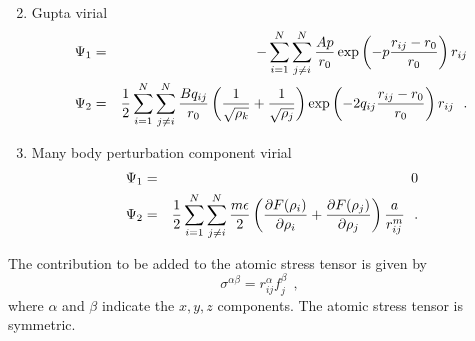 \begin{enumerate}
\begin{eqnarray}
\end{eqnarray}
\item Gupta virial
\begin{eqnarray}
\Psi_{1} &=& -\sum_{i=1}^{N} \sum_{j \ne i}^{N}
\frac{A p}{r_{0}} \exp \left( -p \frac{r_{ij}-r_{0}}{r_{0}} \right) r_{ij} \nonumber \\
\Psi_{2} &=& {1 \over 2} \sum_{i=1}^{N} \sum_{j \ne i}^{N} \frac{B q_{ij}}{r_{0}}
\left( {1 \over \sqrt{\rho_{k}}} + {1 \over \sqrt{\rho_{j}}} \right)
\exp \left( -2 q_{ij} \frac{r_{ij}-r_{0}}{r_{0}} \right) r_{ij}~~.
\end{eqnarray}
\item Many body perturbation component virial
\begin{eqnarray}
\Psi_{1} &=& 0 \nonumber \\
\Psi_{2} &=& {1 \over 2} \sum_{i=1}^{N} \sum_{j \ne i}^{N} \frac{m \epsilon}{2} \left( \frac{\partial F(\rho_{i})}{\partial \rho_{i}} +
\frac{\partial F(\rho_{j})}{\partial \rho_{j}} \right) \frac{a}{r_{ij}^{m}}~~.
\end{eqnarray}
\end{enumerate}

The contribution to be added to the atomic stress tensor is
given by
\begin{equation}
\sigma^{\alpha \beta} = r_{ij}^{\alpha} f_{j}^{\beta}~~,
\end{equation}
where $\alpha$ and $\beta$ indicate the $x,y,z$ components.  The
atomic stress tensor is symmetric.

